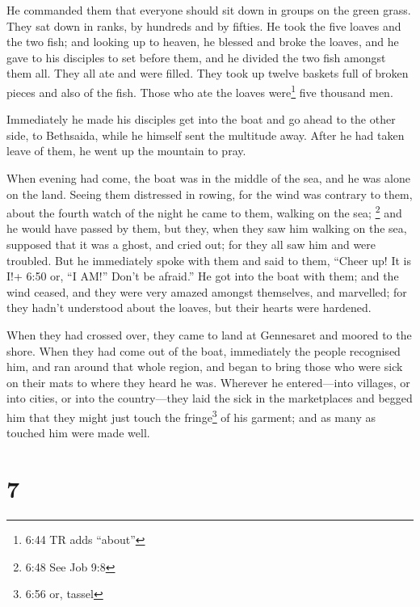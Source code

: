  He commanded them that everyone should sit down in groups
on the green grass.  They sat down in ranks, by hundreds
and by fifties.  He took the five loaves and the two fish;
and looking up to heaven, he blessed and broke the loaves, and he gave
to his disciples to set before them, and he divided the two fish amongst
them all.  They all ate and were filled.  They
took up twelve baskets full of broken pieces and also of the fish.
 Those who ate the loaves were\footnote{6:44 TR adds
  ``about''} five thousand men.

 Immediately he made his disciples get into the boat and go
ahead to the other side, to Bethsaida, while he himself sent the
multitude away.  After he had taken leave of them, he went
up the mountain to pray.

 When evening had come, the boat was in the middle of the
sea, and he was alone on the land.  Seeing them distressed
in rowing, for the wind was contrary to them, about the fourth watch of
the night he came to them, walking on the sea; \footnote{6:48 See Job
  9:8} and he would have passed by them,  but they, when
they saw him walking on the sea, supposed that it was a ghost, and cried
out;  for they all saw him and were troubled. But he
immediately spoke with them and said to them, ``Cheer up! It is I!+ 6:50
or, ``I AM!'' Don't be afraid.''  He got into the boat with
them; and the wind ceased, and they were very amazed amongst themselves,
and marvelled;  for they hadn't understood about the
loaves, but their hearts were hardened.

 When they had crossed over, they came to land at
Gennesaret and moored to the shore.  When they had come out
of the boat, immediately the people recognised him,  and
ran around that whole region, and began to bring those who were sick on
their mats to where they heard he was.  Wherever he
entered---into villages, or into cities, or into the country---they laid
the sick in the marketplaces and begged him that they might just touch
the fringe\footnote{6:56 or, tassel} of his garment; and as many as
touched him were made well.

\hypertarget{section-6}{%
\section{7}\label{section-6}}

